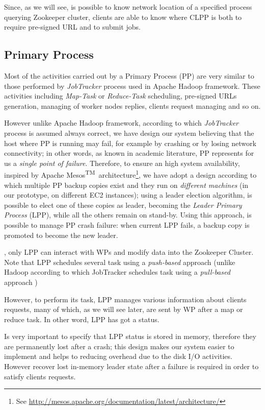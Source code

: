 \documentclass[sigchi]{acmart}
\begin{document}
Since, as we will see, is possible to know network location of a specified process querying Zookeeper cluster, clients are able to know where CLPP is both to require pre-signed URL and to submit jobs.

\subsection{Primary Process}

Most of the activities carried out by a Primary Process (PP) are very similar to those performed by \textit{JobTracker} process used in Apache Hadoop framework. These activities including \textit{Map-Task} or \textit{Reduce-Task} scheduling, pre-signed URLs generation, managing of worker nodes replies, clients request managing and so on.

However unlike Apache Hadoop framework, according to which \textit{JobTracker} process is assumed always correct, we have design our system believing that the host where PP is running may fail, for example by crashing or by losing network connectivity; in other words, as known in academic literature, PP represents for us a \textit{single point of failure}. Therefore, to ensure an high system availability, inspired by Apache Mesos\textsuperscript{TM}\ architecture\footnote{See \url{http://mesos.apache.org/documentation/latest/architecture/}}, we have adopt a design according to which multiple PP backup copies exist and they run on \textit{different machines} (in our prototype, on different EC2 instances); using a leader election algorithm, is possible to elect one of these copies as leader, becoming the \textit{Leader Primary Process} (LPP), while all the others remain on stand-by. Using this approach, is possible to manage PP crash failure: when current LPP fails, a backup copy is promoted to become the new leader. 

, only LPP can interact with WPs and modify data into the Zookeeper Cluster. Note that LPP schedules several task using a \textit{push-based} approach (unlike Hadoop according to which JobTracker schedules task using a \textit{pull-based} approach \cite{LARTS})

However, to perform its task, LPP manages various information about clients requests, many of which, as we will see later, are sent by WP after a map or reduce task. In other word, LPP has got a status.

Is very important to specify that LPP status is stored in memory, therefore they are permanently lost after a crash; this design makes our system easier to implement and helps to reducing overhead due to the disk I/O activities. However recover lost in-memory leader state after a failure is required in order to satisfy clients requests. 
\end{document}

